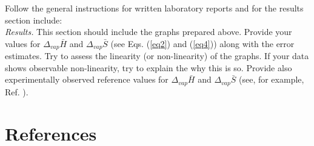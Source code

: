 \documentclass[byrevtex,amssymb,aps,pra,floatfix,letterpaper]{revtex4}
\begin{document}
\noindent
Follow the general instructions for written laboratory reports and for the results section include:\\

\noindent
\textit{Results.} This section should include the graphs prepared above. Provide your values for $\Delta_{vap}\bar{H}$ and $\Delta_{vap}\bar{S}$ (see Eqs. (\ref{eq2}) and (\ref{eq4})) along with the error estimates. Try to assess the linearity (or non-linearity) of the graphs. If your data shows observable non-linearity, try to explain the why this is so. Provide also experimentally observed reference values for $\Delta_{vap}\bar{H}$ and $\Delta_{vap}\bar{S}$ (see, for example, Ref. \cite{ATKINS1}).

\section{References}

\vspace{-1cm}


\end{document}
